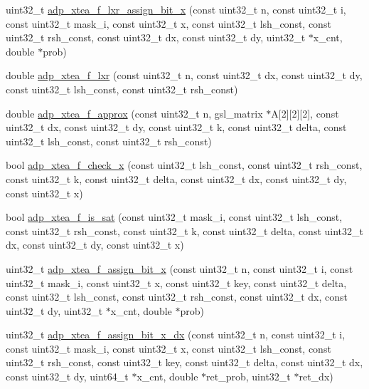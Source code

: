 \begin{DoxyCompactItemize}
\item 
uint32\-\_\-t \hyperlink{adp-xtea-f-fk_8hh_af74a681555779872337a4e2ad155bcb8}{adp\-\_\-xtea\-\_\-f\-\_\-lxr\-\_\-assign\-\_\-bit\-\_\-x} (const uint32\-\_\-t n, const uint32\-\_\-t i, const uint32\-\_\-t mask\-\_\-i, const uint32\-\_\-t x, const uint32\-\_\-t lsh\-\_\-const, const uint32\-\_\-t rsh\-\_\-const, const uint32\-\_\-t dx, const uint32\-\_\-t dy, uint32\-\_\-t $\ast$x\-\_\-cnt, double $\ast$prob)
\item 
double \hyperlink{adp-xtea-f-fk_8hh_aecdf4a2934283c36f0ee6a9778576cb2}{adp\-\_\-xtea\-\_\-f\-\_\-lxr} (const uint32\-\_\-t n, const uint32\-\_\-t dx, const uint32\-\_\-t dy, const uint32\-\_\-t lsh\-\_\-const, const uint32\-\_\-t rsh\-\_\-const)
\item 
double \hyperlink{adp-xtea-f-fk_8hh_a07bf299450a988931eb46ec5cca05150}{adp\-\_\-xtea\-\_\-f\-\_\-approx} (const uint32\-\_\-t n, gsl\-\_\-matrix $\ast$\-A\mbox{[}2\mbox{]}\mbox{[}2\mbox{]}\mbox{[}2\mbox{]}, const uint32\-\_\-t dx, const uint32\-\_\-t dy, const uint32\-\_\-t k, const uint32\-\_\-t delta, const uint32\-\_\-t lsh\-\_\-const, const uint32\-\_\-t rsh\-\_\-const)
\item 
bool \hyperlink{adp-xtea-f-fk_8hh_a0dbedc6aafa2653058d001b6ba96aacd}{adp\-\_\-xtea\-\_\-f\-\_\-check\-\_\-x} (const uint32\-\_\-t lsh\-\_\-const, const uint32\-\_\-t rsh\-\_\-const, const uint32\-\_\-t k, const uint32\-\_\-t delta, const uint32\-\_\-t dx, const uint32\-\_\-t dy, const uint32\-\_\-t x)
\item 
bool \hyperlink{adp-xtea-f-fk_8hh_ad75b1fd6b21a158370f0300b3074b5ee}{adp\-\_\-xtea\-\_\-f\-\_\-is\-\_\-sat} (const uint32\-\_\-t mask\-\_\-i, const uint32\-\_\-t lsh\-\_\-const, const uint32\-\_\-t rsh\-\_\-const, const uint32\-\_\-t k, const uint32\-\_\-t delta, const uint32\-\_\-t dx, const uint32\-\_\-t dy, const uint32\-\_\-t x)
\item 
uint32\-\_\-t \hyperlink{adp-xtea-f-fk_8hh_abcc84ea73f206764cf21c8202c83a240}{adp\-\_\-xtea\-\_\-f\-\_\-assign\-\_\-bit\-\_\-x} (const uint32\-\_\-t n, const uint32\-\_\-t i, const uint32\-\_\-t mask\-\_\-i, const uint32\-\_\-t x, const uint32\-\_\-t key, const uint32\-\_\-t delta, const uint32\-\_\-t lsh\-\_\-const, const uint32\-\_\-t rsh\-\_\-const, const uint32\-\_\-t dx, const uint32\-\_\-t dy, uint32\-\_\-t $\ast$x\-\_\-cnt, double $\ast$prob)
\item 
uint32\-\_\-t \hyperlink{adp-xtea-f-fk_8hh_a6e6f95b87e441a40670f3c03ff0dc7b4}{adp\-\_\-xtea\-\_\-f\-\_\-assign\-\_\-bit\-\_\-x\-\_\-dx} (const uint32\-\_\-t n, const uint32\-\_\-t i, const uint32\-\_\-t mask\-\_\-i, const uint32\-\_\-t x, const uint32\-\_\-t lsh\-\_\-const, const uint32\-\_\-t rsh\-\_\-const, const uint32\-\_\-t key, const uint32\-\_\-t delta, const uint32\-\_\-t dx, const uint32\-\_\-t dy, uint64\-\_\-t $\ast$x\-\_\-cnt, double $\ast$ret\-\_\-prob, uint32\-\_\-t $\ast$ret\-\_\-dx)

\end{DoxyCompactItemize}
